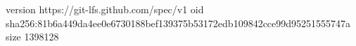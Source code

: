 version https://git-lfs.github.com/spec/v1
oid sha256:81b6a449da4ee0e6730188bef139375b53172edb109842cce99d95251555747a
size 1398128
